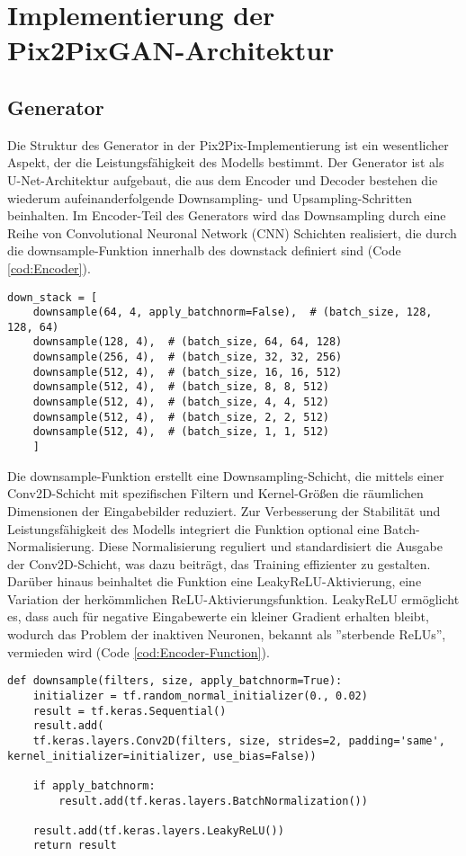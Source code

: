\section{Implementierung der Pix2PixGAN-Architektur}
\subsection{Generator}

Die Struktur des Generator in der Pix2Pix-Implementierung ist ein wesentlicher Aspekt, der die Leistungsfähigkeit des Modells bestimmt. Der Generator ist als U-Net-Architektur aufgebaut, die aus dem Encoder und Decoder bestehen die wiederum  aufeinanderfolgende Downsampling- und Upsampling-Schritten beinhalten.
Im Encoder-Teil des Generators wird das Downsampling durch eine Reihe von Convolutional Neuronal Network (CNN) Schichten realisiert, die durch die downsample-Funktion innerhalb des downstack definiert sind (Code \ref{cod:Encoder}). 
\newpage
\begin{lstlisting}[language=pyhaff, caption={Downsampling-Schritt in Pix2Pix},label={cod:Encoder}]
	down_stack = [
	downsample(64, 4, apply_batchnorm=False),  # (batch_size, 128, 128, 64)
	downsample(128, 4),  # (batch_size, 64, 64, 128)
	downsample(256, 4),  # (batch_size, 32, 32, 256)
	downsample(512, 4),  # (batch_size, 16, 16, 512)
	downsample(512, 4),  # (batch_size, 8, 8, 512)
	downsample(512, 4),  # (batch_size, 4, 4, 512)
	downsample(512, 4),  # (batch_size, 2, 2, 512)
	downsample(512, 4),  # (batch_size, 1, 1, 512)
	]
\end{lstlisting}
Die downsample-Funktion erstellt eine Downsampling-Schicht, die mittels einer Conv2D-Schicht mit spezifischen Filtern und Kernel-Größen die räumlichen Dimensionen der Eingabebilder reduziert. Zur Verbesserung der Stabilität und Leistungsfähigkeit des Modells integriert die Funktion optional eine Batch-\\Normalisierung. Diese Normalisierung reguliert und standardisiert die Ausgabe der Conv2D-Schicht, was dazu beiträgt, das Training effizienter zu gestalten.
Darüber hinaus beinhaltet die Funktion eine LeakyReLU-Aktivierung, eine Variation der herkömmlichen ReLU-Aktivierungsfunktion. LeakyReLU ermöglicht es, dass auch für negative Eingabewerte ein kleiner Gradient erhalten bleibt, wodurch das Problem der inaktiven Neuronen, bekannt als ''sterbende ReLUs'', vermieden wird (Code \ref{cod:Encoder-Function}).

\begin{lstlisting}[language=pyhaff, caption={Downsampling-Schicht in Pix2Pix}, label={cod:Encoder-Function}]
def downsample(filters, size, apply_batchnorm=True):
	initializer = tf.random_normal_initializer(0., 0.02)
	result = tf.keras.Sequential()
	result.add(
	tf.keras.layers.Conv2D(filters, size, strides=2, padding='same', kernel_initializer=initializer, use_bias=False))
	
	if apply_batchnorm:
		result.add(tf.keras.layers.BatchNormalization())
	
	result.add(tf.keras.layers.LeakyReLU())
	return result
\end{lstlisting}


